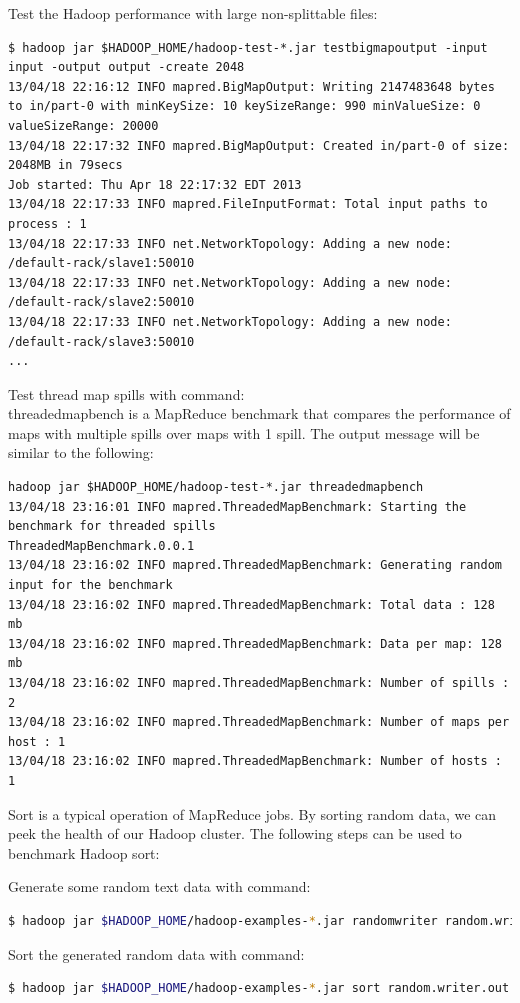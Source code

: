 Test the Hadoop performance with large non-splittable files:
\lstset{style=bashstyle}
\begin{lstlisting}
$ hadoop jar $HADOOP_HOME/hadoop-test-*.jar testbigmapoutput -input input -output output -create 2048
13/04/18 22:16:12 INFO mapred.BigMapOutput: Writing 2147483648 bytes to in/part-0 with minKeySize: 10 keySizeRange: 990 minValueSize: 0 valueSizeRange: 20000
13/04/18 22:17:32 INFO mapred.BigMapOutput: Created in/part-0 of size: 2048MB in 79secs
Job started: Thu Apr 18 22:17:32 EDT 2013
13/04/18 22:17:33 INFO mapred.FileInputFormat: Total input paths to process : 1
13/04/18 22:17:33 INFO net.NetworkTopology: Adding a new node: /default-rack/slave1:50010
13/04/18 22:17:33 INFO net.NetworkTopology: Adding a new node: /default-rack/slave2:50010
13/04/18 22:17:33 INFO net.NetworkTopology: Adding a new node: /default-rack/slave3:50010
...
\end{lstlisting}

Test thread map spills with command: \\
threadedmapbench is a MapReduce benchmark that compares the performance of maps with multiple spills over maps with 1 spill. The output message will be similar to the following:
\lstset{style=bashstyle}
\begin{lstlisting}
hadoop jar $HADOOP_HOME/hadoop-test-*.jar threadedmapbench
13/04/18 23:16:01 INFO mapred.ThreadedMapBenchmark: Starting the benchmark for threaded spills
ThreadedMapBenchmark.0.0.1
13/04/18 23:16:02 INFO mapred.ThreadedMapBenchmark: Generating random input for the benchmark
13/04/18 23:16:02 INFO mapred.ThreadedMapBenchmark: Total data : 128 mb
13/04/18 23:16:02 INFO mapred.ThreadedMapBenchmark: Data per map: 128 mb
13/04/18 23:16:02 INFO mapred.ThreadedMapBenchmark: Number of spills : 2
13/04/18 23:16:02 INFO mapred.ThreadedMapBenchmark: Number of maps per host : 1
13/04/18 23:16:02 INFO mapred.ThreadedMapBenchmark: Number of hosts : 1
\end{lstlisting}
Sort is a typical operation of MapReduce jobs. By sorting random data, we can peek the health of our Hadoop cluster. The following steps can be used to benchmark Hadoop sort:

Generate some random text data with command:
\lstset{style=bashstyle}
\begin{lstlisting}[language=bash]
$ hadoop jar $HADOOP_HOME/hadoop-examples-*.jar randomwriter random.writer.out
\end{lstlisting}

Sort the generated random data with command:
\lstset{style=bashstyle}
\begin{lstlisting}[language=bash]
$ hadoop jar $HADOOP_HOME/hadoop-examples-*.jar sort random.writer.out random.writer.out.sorted
\end{lstlisting}

